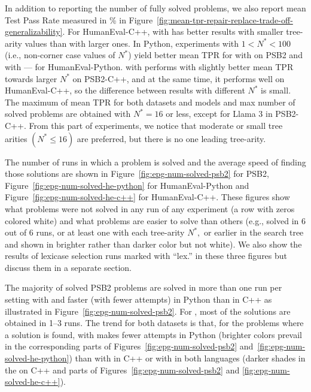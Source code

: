 In addition to reporting the number of fully solved problems, we also report mean Test Pass Rate measured in \% in Figure~\ref{fig:mean-tpr-repair-replace-trade-off-generalizability}. 
For HumanEval-C++, \method{} with \gpt{} has better results with smaller tree-arity values than with larger ones.
In Python, experiments with $1 < N^* < 100$ (i.e., non-corner case values of $N^*$) yield better mean TPR for \method{} with \gpt{} on PSB2 and with \llama{} --- for HumanEval-Python.
\method{} with \llama{} performs with slightly better mean TPR towards larger $N^*$  on PSB2-C++, and at the same time, it performs well on HumanEval-C++, so the difference between results with different $N^*$ is small.
The maximum of mean TPR for both datasets and models and max number of solved problems are obtained with $N^*=16$ or less, except for Llama 3 in PSB2-C++. 
From this part of experiments, we notice that moderate or small tree arities $(N^* \le 16)$ are preferred, but there is no one leading tree-arity.


The number of runs in which a problem is solved and the average speed of finding those solutions are shown in Figure~\ref{fig:epg-num-solved-psb2} for PSB2, Figure~\ref{fig:epg-num-solved-he-python}
for HumanEval-Python and Figure~\ref{fig:epg-num-solved-he-c++} for HumanEval-C++.
These figures show what problems were not solved in any run of any experiment (a row with zeros colored white) and what problems are easier to solve than others (e.g., solved in 6 out of 6 runs, or at least one with each tree-arity $N^*,$ or earlier in the search tree and shown in brighter rather than darker color but not white). 
We also show the results of lexicase selection runs marked with ``lex.'' in these three figures but discuss them in a separate section. 

The majority of solved PSB2 problems are solved in more than one run per setting with \gpt{} and faster (with fewer attempts) in Python than in C++ as illustrated in Figure~\ref{fig:epg-num-solved-psb2}.
For \llama{}, most of the solutions are obtained in 1--3 runs.
The trend for both  datasets is that, for the problems where a solution is found, \method{} with \gpt{} makes fewer attempts in Python (brighter colors prevail in the corresponding parts of Figures~\ref{fig:epg-num-solved-psb2} and~\ref{fig:epg-num-solved-he-python}) than \method{} with \gpt{} in C++ or \method{} with \llama{} in both languages (darker shades in the \gpt{} on C++ and \llama{} parts of Figures~\ref{fig:epg-num-solved-psb2} and \ref{fig:epg-num-solved-he-c++}).



